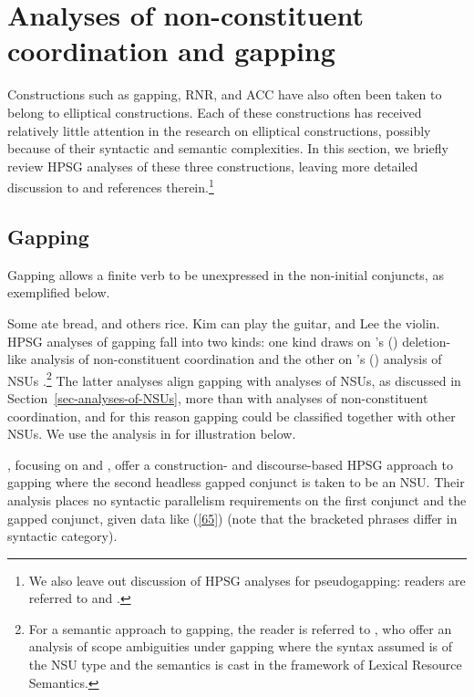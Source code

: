 \section{Analyses of non-constituent coordination and gapping}
\label{sec-analyses-of-noncon}

Constructions such as gapping, RNR, and ACC have also often been taken to belong to elliptical
constructions. Each of these constructions has received relatively little attention in the research
on elliptical constructions, possibly because of their syntactic and semantic complexities. In this
section, we briefly review HPSG analyses of these three constructions, leaving more detailed
discussion to  and references therein.\footnote{We also leave out
  discussion of HPSG analyses for pseudogapping: readers are referred to \citet{Miller92d-u,
    Kim2020} and .}


\subsection{Gapping}

Gapping %
allows a finite
verb to be unexpressed in the non-initial conjuncts, as exemplified below. %

\eal
\label{ex-gapping}
\ex Some ate bread, and others rice.\label{g1}
\ex Kim can play the guitar, and Lee the violin.\label{g2}
\zl
%
%
%
%
HPSG analyses of gapping fall into two kinds: one kind draws on \citeauthor{Beavers2004}'s (\citeyear{Beavers2004}) deletion-like analysis of non-constituent coordination \citep{Chaves2009} and the other on \citeauthor{Ginzburg:Sag:2000}'s (\citeyear{Ginzburg:Sag:2000}) analysis of NSUs \citep{Abeille2014}.\footnote{For a semantic approach to gapping, the reader is referred to \citet{Parketal2019}, who offer an analysis of scope ambiguities under gapping where the syntax assumed is of the NSU  type and the semantics is cast in the framework of Lexical Resource Semantics.} The latter analyses align gapping with analyses of NSUs, as discussed in Section~\ref{sec-analyses-of-NSUs}, more than with analyses of non-constituent coordination, and for this reason gapping could be classified together with other NSUs. We use the analysis in \citet{Abeille2014} for illustration below.


\citet{Abeille2014}, focusing on  and , offer a construction- and
discourse-based HPSG approach to gapping where the second headless gapped conjunct is taken to be an
NSU.  %
Their analysis places no syntactic parallelism requirements on the
first conjunct and the gapped conjunct, given  data like (\ref{65}) (note that the bracketed phrases differ in syntactic category).

